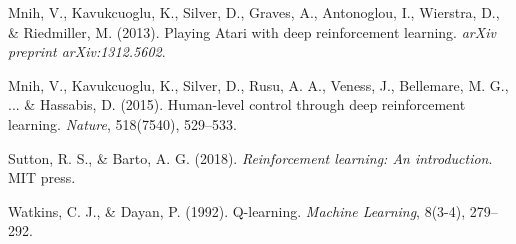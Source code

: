 \documentclass[10pt,journal,compsoc]{IEEEtran}
\begin{document}
\begin{thebibliography}{99}
Mnih, V., Kavukcuoglu, K., Silver, D., Graves, A., Antonoglou, I., Wierstra, D., \& Riedmiller, M. (2013).
\newblock Playing Atari with deep reinforcement learning.
\newblock \textit{arXiv preprint arXiv:1312.5602}.

Mnih, V., Kavukcuoglu, K., Silver, D., Rusu, A. A., Veness, J., Bellemare, M. G., ... \& Hassabis, D. (2015).
\newblock Human-level control through deep reinforcement learning.
\newblock \textit{Nature}, 518(7540), 529--533.

Sutton, R. S., \& Barto, A. G. (2018).
\newblock \textit{Reinforcement learning: An introduction}.
\newblock MIT press.

Watkins, C. J., \& Dayan, P. (1992).
\newblock Q-learning.
\newblock \textit{Machine Learning}, 8(3-4), 279--292.

\end{thebibliography}
\end{document}
